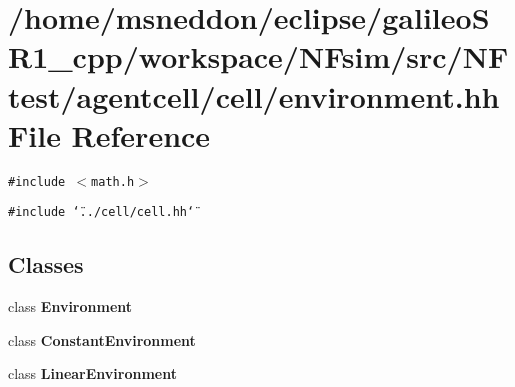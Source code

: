\section{/home/msneddon/eclipse/galileoSR1\_\-cpp/workspace/NFsim/src/NFtest/agentcell/cell/environment.hh File Reference}
\label{environment_8hh}


{\tt \#include $<$math.h$>$}\par
{\tt \#include \char`\"{}../cell/cell.hh\char`\"{}}\par
\subsection*{Classes}
\begin{CompactItemize}
\item 
class {\bf Environment}
\item 
class {\bf ConstantEnvironment}
\item 
class {\bf LinearEnvironment}
\end{CompactItemize}
